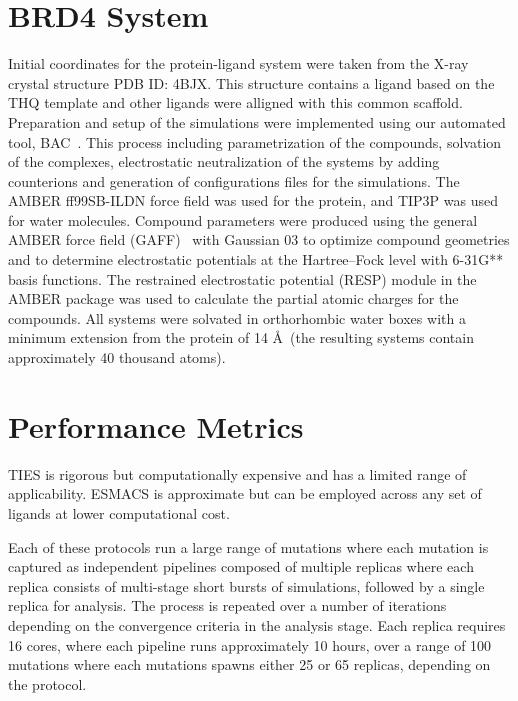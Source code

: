 \documentclass[conference]{IEEEtran}
\begin{document}
\section{BRD4 System}\label{sec:system_description}

Initial coordinates for the protein-ligand system were taken from the X-ray
crystal structure PDB ID: 4BJX.
This structure contains a
ligand based on the THQ template and other ligands were alligned with this
common scaffold. Preparation and setup of the simulations were implemented
using our automated tool, BAC~\cite{Sadiq2008}. This process including
parametrization of the compounds, solvation of the complexes, electrostatic
neutralization of the systems by adding counterions and generation of
configurations files for the simulations. The AMBER ff99SB-ILDN
force field was used for the protein, and TIP3P was used
for water molecules. Compound parameters were produced using the general AMBER
force field (GAFF)~\cite{Wang2004} with Gaussian 03
to optimize compound geometries and to determine electrostatic potentials at
the Hartree–Fock level with 6-31G** basis functions. The restrained
electrostatic potential (RESP) module in the AMBER package
was used to calculate the partial atomic charges for the compounds. All systems
were solvated in orthorhombic water boxes with a minimum extension from the
protein of 14 \AA\ (the resulting systems contain approximately 40 thousand
atoms).

\section{Performance Metrics}\label{sec:performance}

TIES is rigorous but computationally expensive and has a limited range of
applicability. ESMACS is approximate but can be employed across any set of
ligands at lower computational cost.

Each of these protocols run a large range of mutations where each
mutation is captured as independent pipelines composed of multiple replicas
where each replica consists of multi-stage short bursts
of simulations, followed by a single replica for analysis. The process is
repeated over a number of iterations depending on the convergence criteria
in the analysis stage. Each replica requires 16 cores, where each pipeline
runs approximately 10 hours, over a range of 100 mutations where each mutations
spawns either 25 or 65 replicas, depending on the protocol.
\end{document}
